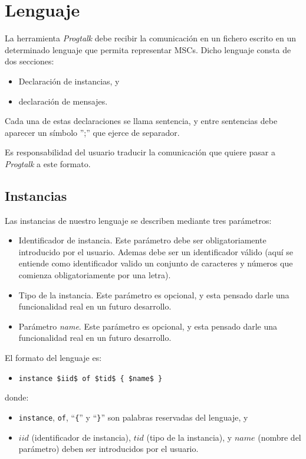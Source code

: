 \documentclass[12pt,a4paper]{report}
\newcommand{\lstsetpt}{
  \lstset{
    language=progtalk,
    style=spec,
  }
}
\begin{document}
\chapter{Lenguaje}
\label{ch:lenguaje}
\lstsetpt

La herramienta \textit{Progtalk} debe recibir la comunicación en un fichero escrito en un determinado lenguaje que permita representar MSCs. Dicho lenguaje consta de dos secciones:
\begin{itemize}
\item Declaración de instancias, y
\item declaración de mensajes.
\end{itemize}

Cada una de estas declaraciones se llama sentencia, y entre sentencias debe aparecer un símbolo '';'' que ejerce de separador.

Es responsabilidad del usuario traducir la comunicación que quiere pasar a \textit{Progtalk} a este formato.

\section{Instancias}

Las instancias de nuestro lenguaje se describen mediante tres parámetros:

\begin{itemize}
\item Identificador de instancia. Este parámetro debe ser obligatoriamente introducido por el usuario. Ademas debe ser un identificador válido (aquí se entiende como identificador valido un conjunto de caracteres y números que comienza obligatoriamente por una letra).
\item Tipo de la instancia. Este parámetro es opcional, y esta pensado darle una funcionalidad real en un futuro desarrollo.
\item Parámetro \textit{name}. Este parámetro es opcional, y esta pensado darle una funcionalidad real en un futuro desarrollo.
\end{itemize}

El formato del lenguaje es:

\begin{itemize}
\item \lstinline[mathescape]!instance $iid$ of $tid$ { $name$ }!
\end{itemize}
donde:
\begin{itemize}
\item \lstinline{instance}, \lstinline{of}, ``\lstinline!{!'' y ``\lstinline!}!'' son palabras reservadas del lenguaje, y
\item $iid$ (identificador de instancia), $tid$ (tipo de la instancia), y $name$ (nombre del parámetro) deben ser introducidos por el usuario.
\end{itemize}
\end{document}
